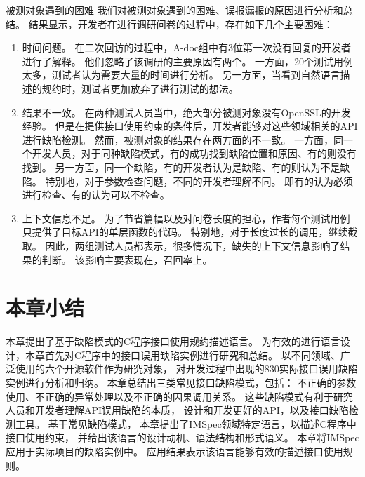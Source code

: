 {\kaishu 被测对象遇到的困难 }
我们对被测对象遇到的困难、误报漏报的原因进行分析和总结。
结果显示，开发者在进行调研问卷的过程中，存在如下几个主要困难：
\begin{enumerate}
	\item 时间问题。
	在二次回访的过程中，A-doc组中有3位第一次没有回复的开发者进行了解释。
	他们忽略了该调研的主要原因有两个。
	一方面，20个测试用例太多，测试者认为需要大量的时间进行分析。
	另一方面，当看到自然语言描述的规约时，测试者更加放弃了进行测试的想法。
	\item 结果不一致。
	在两种测试人员当中，绝大部分被测对象没有OpenSSL的开发经验。
	但是在提供接口使用约束的条件后，开发者能够对这些领域相关的API进行缺陷检测。
	然而，被测对象的结果存在两方面的不一致。
	一方面，同一个开发人员，对于同种缺陷模式，有的成功找到缺陷位置和原因、有的则没有找到。
	另一方面，同一个缺陷，有的开发者认为是缺陷、有的则认为不是缺陷。
	特别地，对于参数检查问题，不同的开发者理解不同。
	即有的认为必须进行检查、有的认为可以不检查。
	\item 上下文信息不足。
	为了节省篇幅以及对问卷长度的担心，作者每个测试用例只提供了目标API的单层函数的代码。
	特别地，对于长度过长的调用，继续截取。
	因此，两组测试人员都表示，很多情况下，缺失的上下文信息影响了结果的判断。
	该影响主要表现在，召回率上。
\end{enumerate}
	
	


\section{本章小结}
\label{sec:2.6}
本章提出了基于缺陷模式的C程序接口使用规约描述语言。
为有效的进行语言设计，本章首先对C程序中的接口误用缺陷实例进行研究和总结。
以不同领域、广泛使用的六个开源软件作为研究对象，
对开发过程中出现的830实际接口误用缺陷实例进行分析和归纳。
本章总结出三类常见接口缺陷模式，包括：
不正确的参数使用、不正确的异常处理以及不正确的因果调用关系。
这些缺陷模式有利于研究人员和开发者理解API误用缺陷的本质，
设计和开发更好的API，以及接口缺陷检测工具。
基于常见缺陷模式，
本章提出了IMSpec领域特定语言，以描述C程序中接口使用约束，
并给出该语言的设计动机、语法结构和形式语义。
本章将IMSpec应用于实际项目的缺陷实例中。
应用结果表示该语言能够有效的描述接口使用规则。
